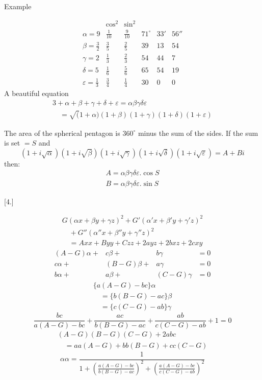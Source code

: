 Example



\[
\begin{array}{lccrrr} &\cos^{2}&\sin^{2}&&&\\[9pt] \alpha=9&\frac{1}{10}&\frac{9}{10}&71^{\circ}&33'&56''\\[9pt] \beta=\frac{3}{2}&\frac{3}{5}&\frac{2}{5}&39&13&54\\[9pt] \gamma=2&\frac{1}{3}&\frac{2}{3}&54&44&7\\[9pt] \delta=5&\frac{1}{6}&\frac{5}{6}&65&54&19\\[9pt] \varepsilon=\frac{1}{3}&\frac{3}{4}&\frac{1}{4}&30&0&0 \end{array}
\]
A beautiful equation
\[
\begin{gathered}3+\alpha+\beta+\gamma+\delta+\varepsilon =\alpha\beta\gamma\delta\varepsilon \\[9pt]\quad{}=\surd(1+\alpha)(1+\beta)(1+\gamma)(1+\delta)(1+\varepsilon)\end{gathered}
\]
\par The area of the spherical pentagon is $360^{\circ}$ minus the sum of the sides.
If the sum is set $=S$ and
\[
(1+i\surd\alpha)(1+i\surd\beta)(1+i\surd\gamma) (1+i\surd\delta)(1+i\surd\varepsilon)=A+Bi
\]
then:
\[
\begin{gathered} A=\alpha\beta\gamma\delta\varepsilon.\cos S\\[9pt] B=\alpha\beta\gamma\delta\varepsilon.\sin S \end{gathered}
\]

\par\medskip{}\centerline{[4.]}\nobreak\smallskip
\[
\begin{gathered} G(\alpha x+\beta y+\gamma z)^2 +G'(\alpha'x+\beta'y+\gamma'z)^2 \\[9pt]\quad{}+G''(\alpha''x+\beta''y+\gamma''z)^2\\[9pt] \quad=Axx+Byy+Czz+2ayz+2bxz+2cxy \end{gathered}
\]
\[
\begin{array}{rrrr} (A-G)\alpha+&c\beta+&b\gamma&=0\\[9pt] c\alpha+&(B-G)\beta+&a\gamma&=0\\[9pt] b\alpha+&a\beta+&(C-G)\gamma&=0 \end{array}
\]
\[
\begin{gathered}\{a(A-G)-bc\}\alpha\\[9pt]\quad{}=\{b(B-G)-ac\}\beta\\[9pt]\quad{}=\{c(C-G)-ab\}\gamma\end{gathered}
\]
\[
\frac{bc}{a(A-G)-bc}+\frac{ac}{b(B-G)-ac} +\frac{ab}{c(C-G)-ab}+1=0
\]
\[
\begin{gathered}(A-G)(B-G)(C-G)+2abc\\[9pt]\quad{}=aa(A-G)+bb(B-G)+cc(C-G)\end{gathered}
\]
\[
\alpha\alpha=\frac{1}{1+ \left(\frac{a(A-G)-bc}{b(B-G)-ac}\right)^2+ \left(\frac{a(A-G)-bc}{c(C-G)-ab}\right)^2}
\]


